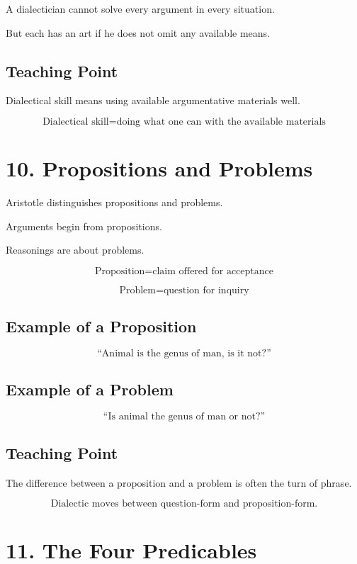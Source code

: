 \documentclass[12pt]{article}
\begin{document}
A dialectician cannot solve every argument in every situation.

But each has an art if he does not omit any available means.

\subsection*{Teaching Point}

Dialectical skill means using available argumentative materials well.

\[
\boxed{
\text{Dialectical skill} = \text{doing what one can with the available materials}
}
\]

\section*{10. Propositions and Problems}

Aristotle distinguishes propositions and problems.

Arguments begin from propositions.

Reasonings are about problems.

\[
\boxed{
\text{Proposition} = \text{claim offered for acceptance}
}
\]

\[
\boxed{
\text{Problem} = \text{question for inquiry}
}
\]

\subsection*{Example of a Proposition}

\[
\text{``Animal is the genus of man, is it not?''}
\]

\subsection*{Example of a Problem}

\[
\text{``Is animal the genus of man or not?''}
\]

\subsection*{Teaching Point}

The difference between a proposition and a problem is often the turn of phrase.

\[
\boxed{
\text{Dialectic moves between question-form and proposition-form.}
}
\]

\section*{11. The Four Predicables}
\end{document}
